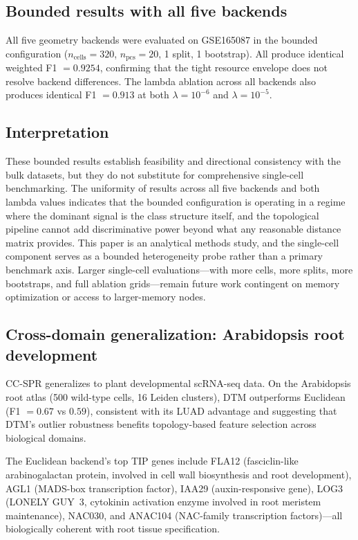 \documentclass[11pt]{article}
\begin{document}
\subsection{Bounded results with all five backends}

All five geometry backends were evaluated on GSE165087 in the bounded configuration ($n_{\text{cells}} = 320$, $n_{\text{pcs}} = 20$, 1 split, 1 bootstrap).
All produce identical weighted F1 $= 0.9254$, confirming that the tight resource envelope does not resolve backend differences.
The lambda ablation across all backends also produces identical F1 $= 0.913$ at both $\lambda = 10^{-6}$ and $\lambda = 10^{-5}$.

\subsection{Interpretation}

These bounded results establish feasibility and directional consistency with the bulk datasets, but they do not substitute for comprehensive single-cell benchmarking.
The uniformity of results across all five backends and both lambda values indicates that the bounded configuration is operating in a regime where the dominant signal is the class structure itself, and the topological pipeline cannot add discriminative power beyond what any reasonable distance matrix provides.
This paper is an analytical methods study, and the single-cell component serves as a bounded heterogeneity probe rather than a primary benchmark axis.
Larger single-cell evaluations---with more cells, more splits, more bootstraps, and full ablation grids---remain future work contingent on memory optimization or access to larger-memory nodes.

\subsection{Cross-domain generalization: Arabidopsis root development}

CC-SPR generalizes to plant developmental scRNA-seq data.
On the Arabidopsis root atlas (500 wild-type cells, 16 Leiden clusters), DTM outperforms Euclidean (F1 $= 0.67$ vs $0.59$), consistent with its LUAD advantage and suggesting that DTM's outlier robustness benefits topology-based feature selection across biological domains.

The Euclidean backend's top TIP genes include FLA12 (fasciclin-like arabinogalactan protein, involved in cell wall biosynthesis and root development), AGL1 (MADS-box transcription factor), IAA29 (auxin-responsive gene), LOG3 (LONELY GUY~3, cytokinin activation enzyme involved in root meristem maintenance), NAC030, and ANAC104 (NAC-family transcription factors)---all biologically coherent with root tissue specification.
\end{document}
